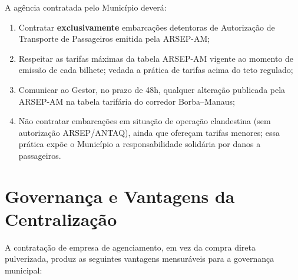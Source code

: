 \documentclass[12pt,a4paper]{article}
\begin{document}
A agência contratada pelo Município deverá:

\begin{enumerate}
  \item Contratar \textbf{exclusivamente} embarcações detentoras de
    Autorização de Transporte de Passageiros emitida pela ARSEP-AM;

  \item Respeitar as tarifas máximas da tabela ARSEP-AM vigente ao momento
    de emissão de cada bilhete; vedada a prática de tarifas acima do teto
    regulado;

  \item Comunicar ao Gestor, no prazo de 48h, qualquer alteração publicada
    pela ARSEP-AM na tabela tarifária do corredor Borba--Manaus;

  \item Não contratar embarcações em situação de operação clandestina
    (sem autorização ARSEP/ANTAQ), ainda que ofereçam tarifas menores;
    essa prática expõe o Município a responsabilidade solidária por danos
    a passageiros.
\end{enumerate}

\section{Governança e Vantagens da Centralização}

A contratação de empresa de agenciamento, em vez da compra direta pulverizada,
produz as seguintes vantagens mensuráveis para a governança municipal:
\end{document}
